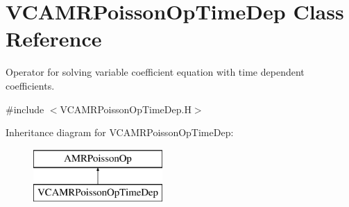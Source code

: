 \hypertarget{class_v_c_a_m_r_poisson_op_time_dep}{\section{V\-C\-A\-M\-R\-Poisson\-Op\-Time\-Dep Class Reference}
\label{class_v_c_a_m_r_poisson_op_time_dep}
}


Operator for solving variable coefficient equation with time dependent coefficients.  




{\ttfamily \#include $<$V\-C\-A\-M\-R\-Poisson\-Op\-Time\-Dep.\-H$>$}

Inheritance diagram for V\-C\-A\-M\-R\-Poisson\-Op\-Time\-Dep\-:\begin{figure}[H]
\begin{center}
\leavevmode
\includegraphics[height=2.000000cm]{class_v_c_a_m_r_poisson_op_time_dep}
\end{center}
\end{figure}
